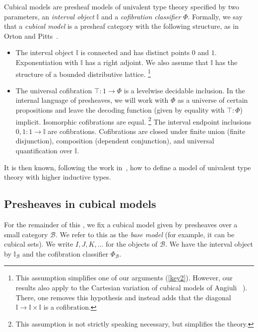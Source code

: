 \documentclass[10pt,a4paper,draft]{article}
\newcommand{\II}{\mathbb{I}}
\newcommand{\CC}{{\mathcal C}}
\newcommand{\BB}{\mathcal{B}}
\renewcommand{\~}{\widetilde}
\newcommand{\cofuniv}{\Phi}
\theoremstyle{definition}
\theoremstyle{remark} %
\begin{document}
Cubical models are presheaf models of univalent type theory specified by two parameters, an \emph{interval object} $\II$ and a \emph{cofibration classifier} $\cofuniv$.
Formally, we say that a \emph{cubical model} is a presheaf category with the following structure, as in Orton and Pitts~\cite{OrtonP16}.
\begin{itemize}
\item
The interval object $\II$ is connected and has distinct points $0$ and $1$.
Exponentiation with $\II$ has a right adjoint.
We also assume that $\II$ has the structure of a bounded distributive lattice.%
\footnote{%
This assumption simplifies one of our arguments (\cref{key2}).
However, our results also apply to the Cartesian variation of cubical models of Angiuli \etal~\cite{AngiuliBCHHL}).
There, one removes this hypothesis and instead adds that the diagonal $\II \to \II \times \II$ is a cofibration.
}
\item
The universal cofibration $\top \colon 1 \to \cofuniv$ is a levelwise decidable inclusion.
In the internal language of presheaves, we will work with $\cofuniv$ as a universe of certain propositions and leave the decoding function (given by equality with $\top : \cofuniv$) implicit.
Isomorphic cofibrations are equal.%
\footnote{This assumption is not strictly speaking necessary, but simplifies the theory.}
The interval endpoint inclusions $0, 1 \colon 1 \to \II$ are cofibrations.
Cofibrations are closed under finite union (finite disjunction), composition (dependent conjunction), and universal quantification over $\II$.
\end{itemize}
It is then known, following the work in~\cite{CCHM15,OrtonP16,CHM18}, how to define a model of univalent type theory with higher inductive types.

\subsection{Presheaves in cubical models}\label{subsec:presheaves-in-cubical-sets}

For the remainder of this , we fix a cubical model given by presheaves over a small category $\BB$.
We refer to this as the \emph{base model} (for example, it can be cubical sets).
We write $I,J,K,\dots$ for the objects of $\BB$.
We have the interval object by $\II_{\BB}$ and the cofibration classifier $\cofuniv_{\BB}$.

\end{document}
